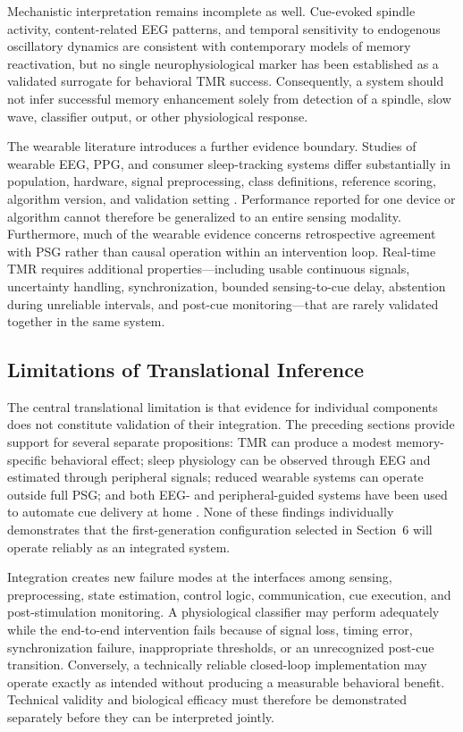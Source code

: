 Mechanistic interpretation remains incomplete as well. Cue-evoked spindle
activity, content-related EEG patterns, and temporal sensitivity to endogenous
oscillatory dynamics are consistent with contemporary models of memory
reactivation, but no single neurophysiological marker has been established as a
validated surrogate for behavioral TMR success. Consequently, a system should
not infer successful memory enhancement solely from detection of a spindle,
slow wave, classifier output, or other physiological response.

The wearable literature introduces a further evidence boundary. Studies of
wearable EEG, PPG, and consumer sleep-tracking systems differ substantially in
population, hardware, signal preprocessing, class definitions, reference
scoring, algorithm version, and validation setting
\citep{arnal2020dreem,korkalainen2020ppg,chinoy2021consumer,
ravindran2025dreem}. Performance reported for one device or algorithm cannot
therefore be generalized to an entire sensing modality. Furthermore, much of
the wearable evidence concerns retrospective agreement with PSG rather than
causal operation within an intervention loop. Real-time TMR requires additional
properties---including usable continuous signals, uncertainty handling,
synchronization, bounded sensing-to-cue delay, abstention during unreliable
intervals, and post-cue monitoring---that are rarely validated together in the
same system.


\subsection{Limitations of Translational Inference}

The central translational limitation is that evidence for individual components
does not constitute validation of their integration. The preceding sections
provide support for several separate propositions: TMR can produce a modest
memory-specific behavioral effect; sleep physiology can be observed through
EEG and estimated through peripheral signals; reduced wearable systems can
operate outside full PSG; and both EEG- and peripheral-guided systems have been
used to automate cue delivery at home
\citep{whitmore2022improving,salfi2025promoting}. None of these findings
individually demonstrates that the first-generation configuration selected in
Section~6 will operate reliably as an integrated system.

Integration creates new failure modes at the interfaces among sensing,
preprocessing, state estimation, control logic, communication, cue execution,
and post-stimulation monitoring. A physiological classifier may perform
adequately while the end-to-end intervention fails because of signal loss,
timing error, synchronization failure, inappropriate thresholds, or an
unrecognized post-cue transition. Conversely, a technically reliable
closed-loop implementation may operate exactly as intended without producing a
measurable behavioral benefit. Technical validity and biological efficacy must
therefore be demonstrated separately before they can be interpreted jointly.

